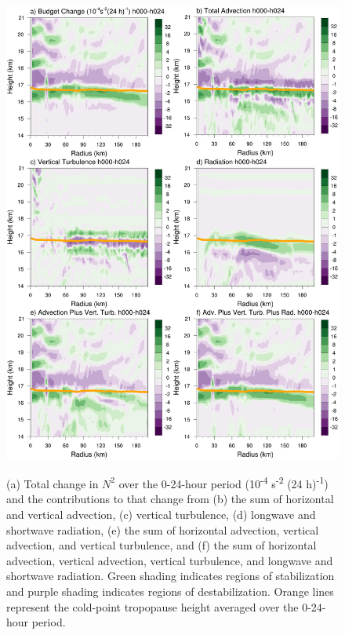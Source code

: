\begin{figure}[ht]
\centerline{\includegraphics[width=39pc]{figures/h000-h024-budgetterms.png}}
\end{figure}
\begin{figure}
\caption{(a) Total change in $N^2$ over the 0-24-hour period (10\textsuperscript{-4} s\textsuperscript{-2} (24 h)\textsuperscript{-1}) and the contributions to that change from (b) the sum of horizontal and vertical advection, (c) vertical turbulence, (d) longwave and shortwave radiation, (e) the sum of horizontal advection, vertical advection, and vertical turbulence, and (f) the sum of horizontal advection, vertical advection, vertical turbulence, and longwave and shortwave radiation.
Green shading indicates regions of stabilization and purple shading indicates regions of destabilization.
Orange lines represent the cold-point tropopause height averaged over the 0-24-hour period.}
\label{fig:stab-00-24}
\end{figure}

